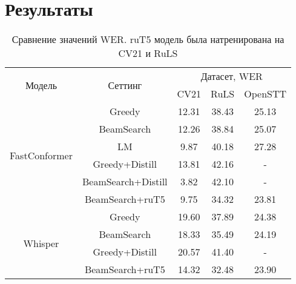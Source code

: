 \section{Результаты}

\begin{table}[]
\centering
\caption{Сравнение значений WER. ruT5 модель была натренирована на CV21 и RuLS}
\begin{tabular}{|c|c|ccc|}
\hline
\multirow{2}{*}{Модель}        & \multirow{2}{*}{Сеттинг}             & \multicolumn{3}{c|}{Датасет, WER}                                    \\ \cline{3-5} 
                               &                                      & \multicolumn{1}{c|}{CV21}  & \multicolumn{1}{c|}{RuLS}     & OpenSTT \\ \hline
\multirow{6}{*}{FastConformer} & Greedy                               & \multicolumn{1}{c|}{12.31} & \multicolumn{1}{c|}{38.43}    & 25.13   \\ \cline{2-5} 
                               & BeamSearch                           & \multicolumn{1}{c|}{12.26} & \multicolumn{1}{c|}{38.84}    & 25.07   \\ \cline{2-5} 
                               & LM                                   & \multicolumn{1}{c|}{9.87}  & \multicolumn{1}{c|}{40.18}    & 27.28   \\ \cline{2-5} 
                               & Greedy+Distill                       & \multicolumn{1}{c|}{13.81} & \multicolumn{1}{c|}{42.16}    & -       \\ \cline{2-5} 
                               & BeamSearch+Distill                   & \multicolumn{1}{c|}{3.82}  & \multicolumn{1}{c|}{42.10}    & -       \\ \cline{2-5} 
                               & BeamSearch+ruT5                      & \multicolumn{1}{c|}{9.75}  & \multicolumn{1}{c|}{34.32}    & 23.81   \\ \hline
\multirow{4}{*}{Whisper}       & Greedy                               & \multicolumn{1}{c|}{19.60} & \multicolumn{1}{c|}{37.89}    & 24.38       \\ \cline{2-5} 
                               & BeamSearch                           & \multicolumn{1}{c|}{18.33} & \multicolumn{1}{c|}{35.49}    & 24.19   \\ \cline{2-5} 
                               & Greedy+Distill                       & \multicolumn{1}{c|}{20.57} & \multicolumn{1}{c|}{41.40}    & -       \\ \cline{2-5} 
                               & BeamSearch+ruT5                      & \multicolumn{1}{c|}{14.32} & \multicolumn{1}{c|}{32.48}    & 23.90   \\ \hline
\end{tabular}
\label{tab:res_full}
\end{table}

